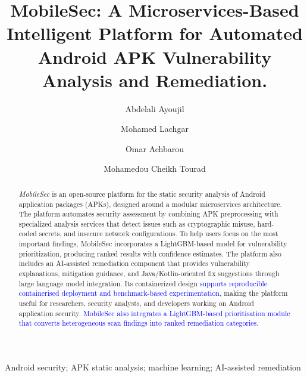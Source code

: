 \documentclass[preprint,12pt, a4paper]{elsarticle}
\begin{document}
\renewcommand{\labelenumii}{\arabic{enumi}.\arabic{enumii}}

\begin{frontmatter}

\title{MobileSec: A Microservices-Based Intelligent Platform for Automated Android APK Vulnerability Analysis and Remediation.}


\author[label1]{Abdelali Ayoujil}
\author[label1,label2]{Mohamed Lachgar}
\author[label3]{Omar Achbarou}
\author[label4]{Mohamedou Cheikh Tourad}

\address[label1]{Cadi Ayyad University, I2IS Laboratory, Marrakech, Morocco}
\address[label2]{Cadi Ayyad University, Higher Normal School (ENS), Computer Science Department, Marrakech, Morocco}
\address[label3]{Cadi Ayyad University, National School of Applied Sciences, IMSC Laboratory, Marrakech, Morocco}
\address[label4]{University of Nouakchott, Faculty of Sciences and Techniques, Al-Khawarizmi,  Nouakchott, Mauritania}

\begin{abstract}
\textit{MobileSec} is an open-source platform for the static security analysis of Android application packages (APKs), designed around a modular microservices architecture. The platform automates security assessment by combining APK preprocessing with specialized analysis services that detect issues such as cryptographic misuse, hard-coded secrets, and insecure network configurations. To help users focus on the most important findings, MobileSec incorporates a LightGBM-based model for vulnerability prioritization, producing ranked results with confidence estimates. The platform also includes an AI-assisted remediation component that provides vulnerability explanations, mitigation guidance, and Java/Kotlin-oriented fix suggestions through large language model integration. Its containerized design \textcolor{blue}{supports reproducible containerised deployment and benchmark-based experimentation}, making the platform useful for researchers, security analysts, and developers working on Android application security. \textcolor{blue}{MobileSec also integrates a LightGBM-based prioritisation module that converts
heterogeneous scan findings into ranked remediation categories.}
\end{abstract}

\begin{keyword}
Android security; APK static analysis; machine learning; AI-assisted remediation
\end{keyword}

\end{frontmatter}
\end{document}
